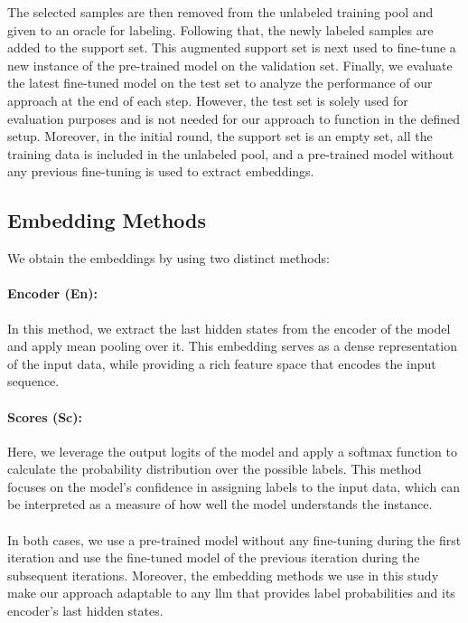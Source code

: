 \documentclass[11pt]{article}
\theoremstyle{definition}
\begin{document}
The selected samples are then removed from the unlabeled training pool and given to an oracle for labeling. Following that, the newly labeled samples are added to the support set. This augmented support set is next used to fine-tune a new instance of the pre-trained model on the validation set. Finally, we evaluate the latest fine-tuned model on the test set to analyze the performance of our approach at the end of each step. However, the test set is solely used for evaluation purposes and is not needed for our approach to function in the defined setup.
Moreover, in the initial round, the support set is an empty set, all the training data is included in the unlabeled pool, and a pre-trained model without any previous fine-tuning is used to extract embeddings.


\subsection{Embedding Methods} \label{sec:embedding_methods}

We obtain the embeddings by using two distinct methods:
\paragraph{Encoder (En):}
In this method, we extract the last hidden states from the encoder of the model and apply mean pooling over it. This embedding serves as a dense representation of the input data, while providing a rich feature space that encodes the input sequence.
\paragraph{Scores (Sc):}
Here, we leverage the output logits of the model and apply a softmax function to calculate the probability distribution over the possible labels. This method focuses on the model's confidence in assigning labels to the input data, which can be interpreted as a measure of how well the model understands the instance.
\paragraph{}

In both cases, we use a pre-trained model without any fine-tuning during the first iteration and use the fine-tuned model of the previous iteration during the subsequent iterations.
Moreover, the embedding methods we use in this study make our approach adaptable to any \gls*{llm} that provides label probabilities and its encoder's last hidden states.
\end{document}
